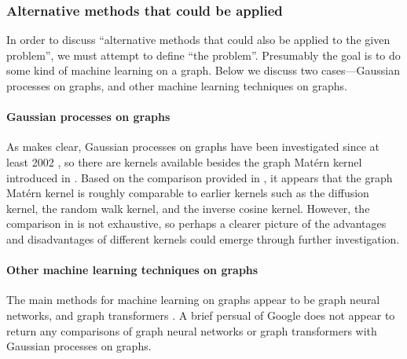 
\subsubsection{Alternative methods that could be applied}


In order to discuss ``alternative methods that could also be applied to the given problem'', we must attempt to define ``the problem''. Presumably the goal is to do some kind of machine learning on a graph. Below we discuss two cases---Gaussian processes on graphs, and other machine learning techniques on graphs.

\paragraph{Gaussian processes on graphs} As \cite{pmlr-v130-borovitskiy21a} makes clear, Gaussian processes on graphs have been investigated since at least 2002 \cite{kondor2002diffusion}, so there are kernels available besides the graph Mat\'{e}rn kernel introduced in \cite{pmlr-v130-borovitskiy21a}. Based on the comparison provided in \cite{pmlr-v130-borovitskiy21a}, it appears that the graph Mat\'{e}rn kernel is roughly comparable to earlier kernels such as the diffusion kernel, the random walk kernel, and the inverse cosine kernel. However, the comparison in \cite{pmlr-v130-borovitskiy21a} is not exhaustive, so perhaps a clearer picture of the advantages and disadvantages of different kernels could emerge through further investigation.

\paragraph{Other machine learning techniques on graphs} The main methods for machine learning on graphs appear to be graph neural networks, and graph transformers \cite{huggraph, stangraph}. A brief persual of Google does not appear to return any comparisons of graph neural networks or graph transformers with Gaussian processes on graphs.


